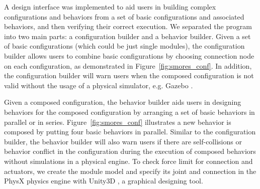 \documentclass[graybox]{svmult}
\newcommand{\TODO}[1]{ {\bf \textcolor{red}{TODO:} #1 }}
\begin{document}

A design interface was implemented to aid users in building complex configurations and behaviors from a set of basic configurations and associated behaviors,
and then verifying their correct execution. We separated the program into two main parts: a configuration builder and a behavior builder.
Given a set of basic configurations (which could be just single modules), the configuration builder allows users to combine basic configurations by choosing connection node on each configuration, as demonstrated in Figure~\ref{fig:smores_conf}. In addition, the configuration builder will warn users when the composed configuration is not valid without the usage of a physical simulator, e.g. Gazebo
\cite{koenig2004design}.

Given a composed configuration, the behavior builder aids users in designing behaviors for the composed configuration by arranging a set of basic behaviors in parallel or in series. Figure~\ref{fig:smores_conf} illustrates a new behavior is composed by putting four basic behaviors in parallel. Similar to the configuration builder, the behavior builder will also warn users if there are self-collisions or behavior conflict in the configuration during the execution of composed behaviors without simulations in a physical engine. To check force limit for connection and actuators, we create the module model and specify its joint and connection in the PhysX \cite{PhysX} physics engine with Unity3D \cite{Unity}, a graphical designing tool. 
\end{document}
